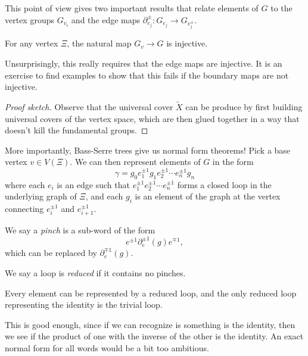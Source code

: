 \documentclass[a4paper]{article}
\begin{document}
\begin{eg}
\begin{center}
  \end{center}
\end{eg}

This point of view gives two important results that relate elements of $G$ to the vertex groups $G_{v_i}$ and the edge maps $\partial_{e_j}^{\pm}: G_{e_j} \to G_{v_j^{\pm}}$.

\begin{lemma}
  For any vertex $\Xi$, the natural map $G_v \to G$ is injective.
\end{lemma}
Unsurprisingly, this really requires that the edge maps are injective. It is an exercise to find examples to show that this fails if the boundary maps are not injective.

\begin{proof}[Proof sketch]
  Observe that the universal cover $\tilde{X}$ can be produce by first building universal covers of the vertex space, which are then glued together in a way that doesn't kill the fundamental groups.
\end{proof}

More importantly, Bass-Serre trees give us normal form theorems! Pick a base vertex $v \in V(\Xi)$. We can then represent elements of $G$ in the form
\[
  \gamma = g_0 e_1^{\pm 1} g_1 e_2^{\pm 1} \cdots e_n^{\pm 1}g_n
\]
where each $e_i$ is an edge such that $e_1^{\pm1} e_2^{\pm 1} \cdots e_n^{\pm1}$ forms a closed loop in the underlying graph of $\Xi$, and each $g_i$ is an element of the graph at the vertex connecting $e_i^{\pm 1}$ and $e_{i + 1}^{\pm 1}$.

We say a \emph{pinch} is a sub-word of the form
\[
  e^{\pm 1} \partial_e^{\pm 1} (g) e^{\mp 1},
\]
which can be replaced by $\partial_e^{\mp 1}(g)$.

We say a loop is \emph{reduced} if it contains no pinches.

\begin{thm}
  Every element can be represented by a reduced loop, and the only reduced loop representing the identity is the trivial loop.
\end{thm}
This is good enough, since if we can recognize is something is the identity, then we see if the product of one with the inverse of the other is the identity. An exact normal form for all words would be a bit too ambitious.
\end{document}
